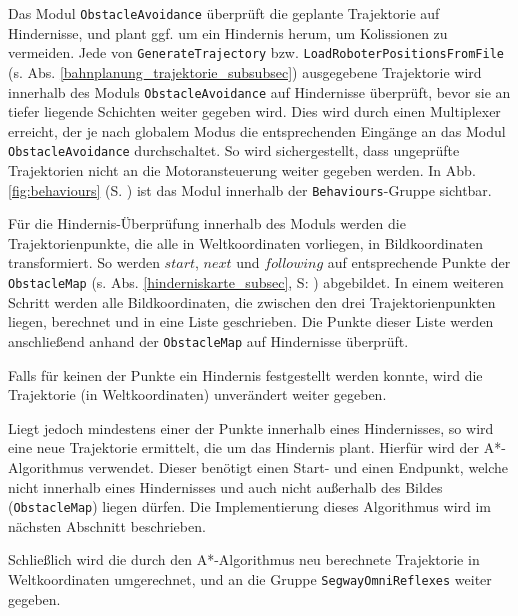 Das Modul \lstinline{ObstacleAvoidance} überprüft die geplante Trajektorie auf Hindernisse, und plant ggf. um ein Hindernis herum, um Kolissionen zu vermeiden.
Jede von \lstinline{GenerateTrajectory} bzw. \lstinline{LoadRoboterPositionsFromFile} (s. Abs. \ref{bahnplanung_trajektorie_subsubsec}) ausgegebene Trajektorie wird innerhalb des Moduls \lstinline{ObstacleAvoidance} auf Hindernisse überprüft, bevor sie an tiefer liegende Schichten weiter gegeben wird.
Dies wird durch einen Multiplexer erreicht, der je nach globalem Modus die entsprechenden Eingänge an das Modul \lstinline{ObstacleAvoidance} durchschaltet.
So wird sichergestellt, dass ungeprüfte Trajektorien nicht an die Motoransteuerung weiter gegeben werden.
In Abb. \ref{fig:behaviours} (S. \pageref{fig:behaviours}) ist das Modul innerhalb der \lstinline{Behaviours}-Gruppe sichtbar.

Für die Hindernis-Überprüfung innerhalb des Moduls werden die Trajektorienpunkte, die alle in Weltkoordinaten vorliegen, in Bildkoordinaten transformiert.
So werden $start$, $next$ und $following$ auf entsprechende Punkte der \lstinline{ObstacleMap} (s. Abs. \ref{hinderniskarte_subsec}, S: \pageref{hinderniskarte_subsec}) abgebildet.
In einem weiteren Schritt werden alle Bildkoordinaten, die zwischen den drei Trajektorienpunkten liegen, berechnet und in eine Liste geschrieben.
Die Punkte dieser Liste werden anschließend anhand der \lstinline{ObstacleMap} auf Hindernisse überprüft.

Falls für keinen der Punkte ein Hindernis festgestellt werden konnte, wird die Trajektorie (in Weltkoordinaten) unverändert weiter gegeben.

Liegt jedoch mindestens einer der Punkte innerhalb eines Hindernisses, so wird eine neue Trajektorie ermittelt, die um das Hindernis plant.
Hierfür wird der A*-Algorithmus verwendet.
Dieser benötigt einen Start- und einen Endpunkt, welche nicht innerhalb eines Hindernisses und auch nicht außerhalb des Bildes (\lstinline{ObstacleMap}) liegen dürfen.
Die Implementierung dieses Algorithmus wird im nächsten Abschnitt beschrieben.

Schließlich wird die durch den A*-Algorithmus neu berechnete Trajektorie in Weltkoordinaten umgerechnet, und an die Gruppe \lstinline{SegwayOmniReflexes} weiter gegeben.

